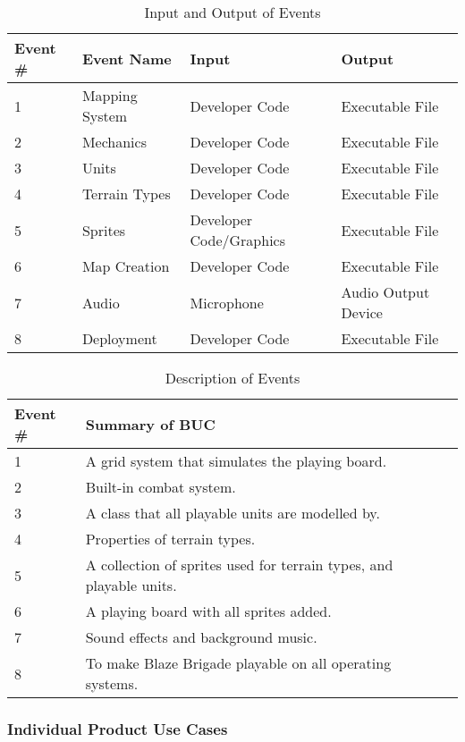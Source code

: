 \documentclass{article}
\begin{document}
\begin{table}[H]
\begin{tabularx}{\textwidth}{lllX}
    \toprule
    Event \# & Event Name & Input & Output \\
    \midrule
    1 & Mapping System & Developer Code & Executable File \\
    2 & Mechanics & Developer Code & Executable File \\
    3 & Units & Developer Code &  Executable File \\
    4 & Terrain Types & Developer Code & Executable File \\
    5 & Sprites & Developer Code/Graphics & Executable File \\
    6 & Map Creation & Developer Code &  Executable File \\
    7 & Audio   & Microphone & Audio Output Device \\
    8 & Deployment   & Developer Code &  Executable File \\
    \bottomrule
\end{tabularx}
\caption{Input and Output of Events}
\end{table}

\bigskip

\noindent
\begin{table}[H]
\begin{tabularx}{\textwidth}{llll}
    \toprule
    Event \# & Summary of BUC \\
    \midrule
    1 & A grid system that simulates the playing board. \\
    2 & Built-in combat system. \\
    3 & A class that all playable units are modelled by. \\
    4 & Properties of terrain types. \\
    5 & A collection of sprites used for terrain types, and playable units. \\
    6 & A playing board with all sprites added. \\
    7 & Sound effects and background music. \\
    8 & To make Blaze Brigade playable on all operating systems. \\
    \bottomrule
\end{tabularx}
\caption{Description of Events}
\end{table}

\subsubsection{Individual Product Use Cases}
\end{document}
